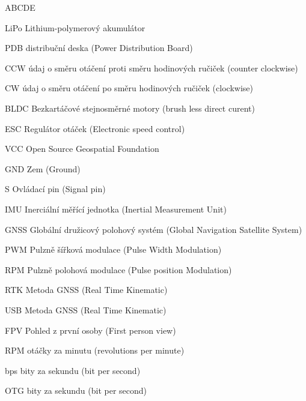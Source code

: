 
\begin{seznamzkratek}{ABCDE}      
	      
		  {LiPo}
	      {Lithium-polymerový akumulátor}
	      
	      {PDB}
	      {distribuční deska  (Power Distribution Board)}

	      {CCW}
	      {údaj o směru otáčení proti směru hodinových ručiček  (counter clockwise)}
	         
	      {CW}
	      {údaj o směru otáčení po směru hodinových ručiček (clockwise)}

	      {BLDC}
	      {Bezkartáčové stejnosměrné motory (brush less direct curent)}
	      
	      {ESC}
	      {Regulátor otáček (Electronic speed control)}	      
	    
	      {VCC}
	      {Open Source Geospatial Foundation} 
  
  		  {GND}
          {Zem (Ground)} 
          
          {S}
          {Ovládací pin (Signal pin)} 

		  {IMU}
          {Inerciální měřící jednotka (Inertial Measurement Unit)} 
          
          {GNSS}
          {Globální družicový polohový systém (Global Navigation Satellite System)} 
          
          {PWM}
          {Pulzně šířková modulace (Pulse Width Modulation)}
          
          {RPM}
          {Pulzně polohová modulace (Pulse position Modulation)}
          
          
          {RTK}
          {Metoda GNSS (Real Time Kinematic)}
          
          {USB}
          {Metoda GNSS (Real Time Kinematic)}
          
          {FPV}
          {Pohled z první osoby (First person view)}
          
          {RPM}
          {otáčky za minutu (revolutions per minute)}
          
          {bps}
          {bity za sekundu (bit per second)}
          
          {OTG}
          {bity za sekundu (bit per second)}
          

\end{seznamzkratek}
